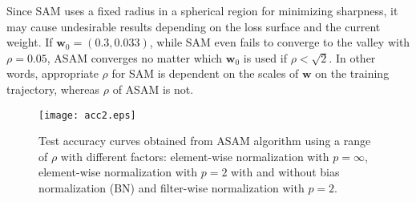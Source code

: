 \documentclass{article}
\newcommand{\mf}[1]{\mathbf{#1}}
\begin{document}
Since SAM uses a fixed radius in a spherical region for minimizing sharpness, it may cause undesirable results depending on the loss surface and the current weight.
If $\mf{w}_0=(0.3,0.033)$, while SAM even fails to converge to the valley with $\rho=0.05$, ASAM converges no matter which $\mf{w}_0$ is used if $\rho<\sqrt{2}$. In other words, appropriate $\rho$ for SAM is dependent on the scales of $\mf{w}$ on the training trajectory, whereas $\rho$ of ASAM is not.

\begin{figure}[!t]
\begin{center}
\centerline{\texttt{[image: acc2.eps]}}
\caption{
Test accuracy curves obtained from ASAM algorithm using a range of $\rho$ with different factors: element-wise normalization with $p=\infty$, element-wise normalization with $p=2$ with and without bias normalization (BN) and filter-wise normalization with $p=2$.
}
\label{normalization}
\end{center}
\end{figure}
\end{document}
